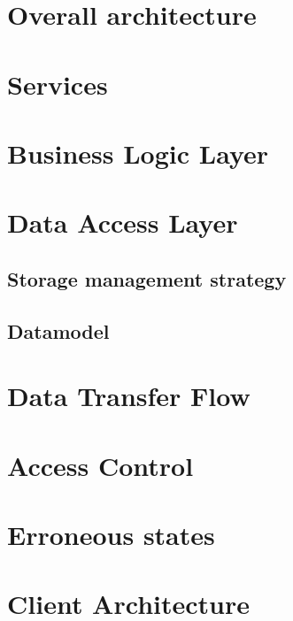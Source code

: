 \documentclass{report}
\begin{document}
\section{Overall architecture}


\section{Services}


\section{Business Logic Layer}


\section{Data Access Layer}
\subsection{Storage management strategy}

\subsection{Datamodel}




\section{Data Transfer Flow}


% 

\section{Access Control}


\section{Erroneous states}




\section{Client Architecture}

\end{document}
